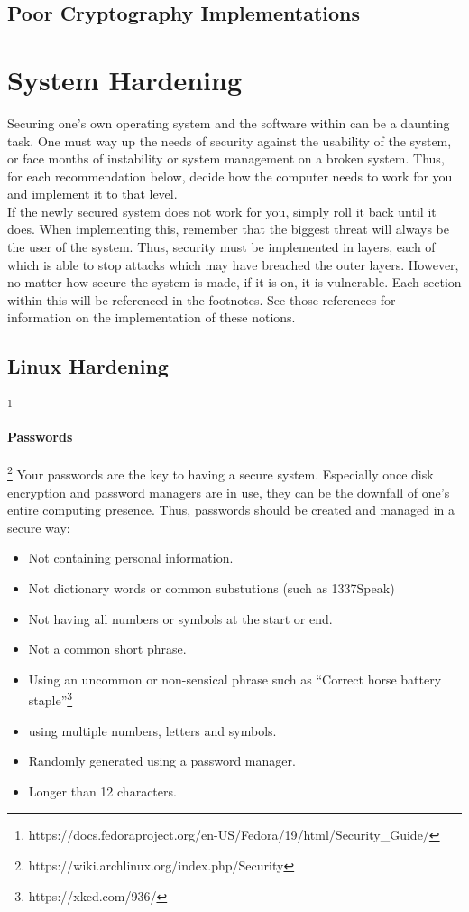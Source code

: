 \documentclass[a4paper,11pt]{article}
\begin{document}
	\subsection{Poor Cryptography Implementations}
\section{System Hardening}
	Securing one's own operating system and the software within can be a daunting task. 
	One must way up the needs of security against the usability of the system, or face months of instability or system management on a broken system. 
	Thus, for each recommendation below, decide how the computer needs to work for you and implement it to that level.\\ 
	If the newly secured system does not work for you, simply roll it back until it does. 
	When implementing this, remember that the biggest threat will always be the user of the system. 
	Thus, security must be implemented in layers, each of which is able to stop attacks which may have breached the outer layers. However, no matter how secure the system is made, if it is on, it is vulnerable. 
	Each section within this will be referenced in the footnotes. See those references for information on the implementation of these notions. 
	\subsection{Linux Hardening} \footnote{https://docs.fedoraproject.org/en-US/Fedora/19/html/Security\_Guide/}
		\paragraph{Passwords} \footnote{https://wiki.archlinux.org/index.php/Security}
			Your passwords are the key to having a secure system. 
			Especially once disk encryption and password managers are in use, they can be the downfall of one's entire computing presence. 
			Thus, passwords should be created and managed in a secure way:
			\begin{itemize}
				\item Not containing personal information.
				\item Not dictionary words or common substutions (such as 1337Speak)
				\item Not having all numbers or symbols at the start or end. 
				\item Not a common short phrase. 
				\item Using an uncommon or non-sensical phrase such as ``Correct horse battery staple''\footnote{https://xkcd.com/936/}
				\item using multiple numbers, letters and symbols. 
				\item Randomly generated using a password manager. %
				\item Longer than 12 characters. 
			\end{itemize}
\end{document}
